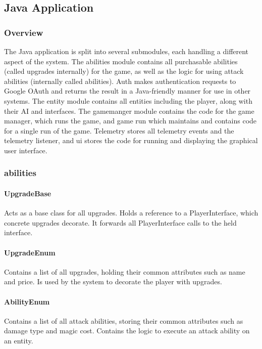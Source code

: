 \documentclass[11pt]{article}
\begin{document}
\subsection{Java Application}
\subsubsection{Overview}
The Java application is split into several submodules, each handling a different aspect of the system. The abilities module contains all purchasable abilities (called upgrades internally) for the game, as well as the logic for using attack abilities (internally called abilities). Auth makes authentication requests to Google OAuth and returns the result in a Java-friendly manner for use in other systems. The entity module contains all entities including the player, along with their AI and interfaces. The gamemanger module contains the code for the game manager, which runs the game, and game run which maintains and contains code for a single run of the game. Telemetry stores all telemetry events and the telemetry listener, and ui stores the code for running and displaying the graphical user interface.

\subsubsection{abilities}

\paragraph{UpgradeBase}
Acts as a base class for all upgrades. Holds a reference to a PlayerInterface, which concrete upgrades decorate. It forwards all PlayerInterface calls to the held interface.

\paragraph{UpgradeEnum}
Contains a list of all upgrades, holding their common attributes such as name and price. Is used by the system to decorate the 
player with upgrades. 

\paragraph{AbilityEnum}
Contains a list of all attack abilities, storing their common attributes such as damage type and magic cost. Contains the logic to execute an attack ability on an entity. 
\end{document}
